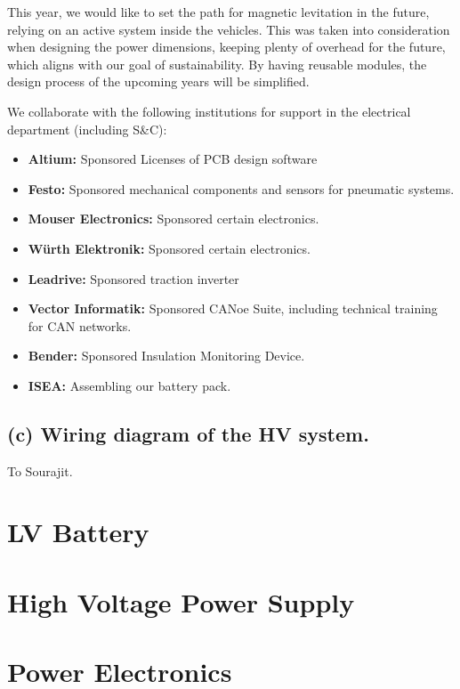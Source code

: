 \par This year, we would like to set the path for magnetic levitation in the future, relying on an active system
inside the vehicles. This was taken into consideration when designing the power dimensions,
keeping plenty of overhead for the future, which aligns with our goal of sustainability.
By having reusable modules, the design process of the upcoming years will be simplified.

\par We collaborate with the following institutions for support in the electrical department (including S\&C):
\begin{itemize}
    \item \textbf{Altium:} Sponsored Licenses of PCB design software
    \item \textbf{Festo:} Sponsored mechanical components and sensors for pneumatic systems.
    \item \textbf{Mouser Electronics:} Sponsored certain electronics.
    \item \textbf{Würth Elektronik:} Sponsored certain electronics.
    \item \textbf{Leadrive:} Sponsored traction inverter
    \item \textbf{Vector Informatik:} Sponsored CANoe Suite, including technical training for CAN networks.
    \item \textbf{Bender:} Sponsored Insulation Monitoring Device.
    \item \textbf{ISEA:} Assembling our battery pack.
\end{itemize}



\subsection{(c) Wiring diagram of the HV system.}
To Sourajit.

\section{LV Battery}


\section{High Voltage Power Supply}


\section{Power Electronics}


